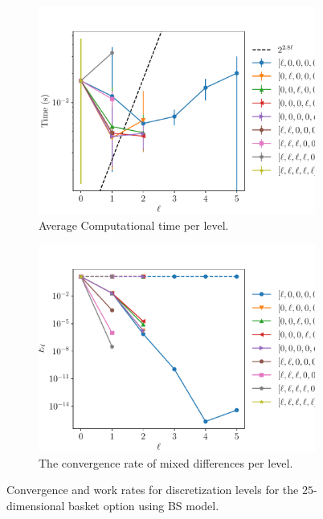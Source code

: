 \documentclass[11pt]{article}
\begin{document}
\begin{figure}[h!]
	\centering
	\begin{subfigure}{.4\textwidth}
		\centering
		\includegraphics[width=1\linewidth]{./figures/25D_basket/level_work.pdf}
		\caption{Average Computational time per level.}
		\label{fig:misc_25D_Basket_sub3}
	\end{subfigure}%
	\begin{subfigure}{.4\textwidth}
		\centering
		\includegraphics[width=1\linewidth]{./figures/25D_basket/levels_error_rate.pdf}
		\caption{The convergence rate of mixed differences per level.}
		\label{fig:misc_25D_Basket_sub4}
	\end{subfigure}%
	\caption{Convergence and work rates for discretization levels for the $25$-dimensional basket option using BS model.}
	\label{fig:misc_25D_Basket_2}
\end{figure}
\end{document}
